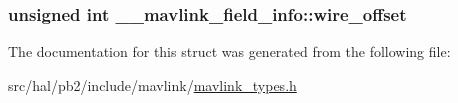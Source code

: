 \subsubsection[{\texorpdfstring{wire\+\_\+offset}{wire_offset}}]{\setlength{\rightskip}{0pt plus 5cm}unsigned int \+\_\+\+\_\+mavlink\+\_\+field\+\_\+info\+::wire\+\_\+offset}\hypertarget{struct____mavlink__field__info_a7156648575e497f112fde78e851dd4d9}{}\label{struct____mavlink__field__info_a7156648575e497f112fde78e851dd4d9}


The documentation for this struct was generated from the following file\+:\begin{DoxyCompactItemize}
\item 
src/hal/pb2/include/mavlink/\hyperlink{mavlink__types_8h}{mavlink\+\_\+types.\+h}\end{DoxyCompactItemize}
